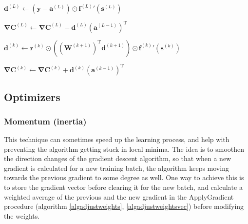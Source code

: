 \documentclass[titlepage]{article}
\begin{document}
          \begin{algorithm}
            \caption{%
              Algorithm \ref{algadjustgradientdropout} with matrix-vector
              notation.
            } \label{algadjustgradientdropoutmtx}
            \begin{algorithmic}
                \State $
                  \mathbf{d}^{(L)} \gets
                    \left( \mathbf{y} - \mathbf{a}^{(L)} \right)
                    \odot
                    {\mathbf{f}^{(L)}}' \left( \mathbf{s}^{(L)} \right)
                $

                \State $
                  \mathbf{\nabla C}^{(L)} \gets
                    \mathbf{\nabla C}^{(L)}
                    +
                    \mathbf{d}^{(L)} \left( \mathbf{a}^{(L-1)} \right)^\mathrm{T}
                $ 

                  \State $
                    \mathbf{d}^{(k)} \gets
                      \mathbf{r}^{(k)}
                      \odot
                      \left(
                        \left( \mathbf{W}^{(k+1)} \right)^\mathrm{T}
                        \mathbf{d}^{(k+1)}
                      \right)
                      \odot
                      {\mathbf{f}^{(k)}}' \left( \mathbf{s}^{(k)} \right)
                  $

                  \State $
                    \mathbf{\nabla C}^{(k)} \gets
                      \mathbf{\nabla C}^{(k)}
                      +
                      \mathbf{d}^{(k)} \left( \mathbf{a}^{(k-1)} \right)^\mathrm{T}
                  $ 
                \EndFor
              \EndProcedure
            \end{algorithmic}
          \end{algorithm}

\newpage

    \subsection{Optimizers}

      \subsubsection{Momentum (inertia)}\label{momentum}

        This technique can sometimes speed up the learning process, and help
        with preventing the algorithm getting stuck in local minima. The idea
        is to smoothen the direction changes of the gradient descent algorithm,
        so that when a new gradient is calculated for a new training batch, the
        algorithm keeps moving towards the previous gradient to some degree as
        well. One way to achieve this is to store the gradient vector before
        clearing it for the new batch, and calculate a weighted average of the
        previous and the new gradient in the ApplyGradient procedure (algorithm
        \ref{algadjustweights}, \ref{algadjustweightsvec}) before modifying the
        weights.
\end{document}
